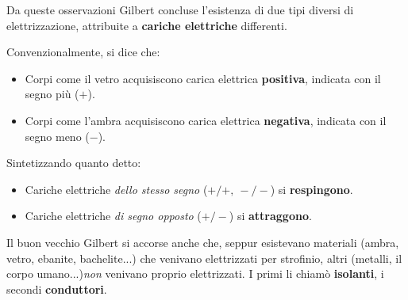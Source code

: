 Da queste osservazioni Gilbert concluse l'esistenza di due tipi diversi di elettrizzazione, attribuite a \textbf{cariche elettriche} differenti.
\begin{define}
	Convenzionalmente, si dice che:
	\begin{itemize}
		\item Corpi come il vetro acquisiscono carica elettrica \textbf{positiva}, indicata con il segno più ($+$).
		\item Corpi come l'ambra acquisiscono carica elettrica \textbf{negativa}, indicata con il segno meno ($-$).
	\end{itemize}
Sintetizzando quanto detto:
\begin{itemize}
	\item Cariche elettriche \textit{dello stesso segno} ($+/+,\ -/-$) si \textbf{respingono}.
	\item Cariche elettriche \textit{di segno opposto} ($+/-$) si \textbf{attraggono}.
\end{itemize}
\end{define}
Il buon vecchio Gilbert si accorse anche che, seppur esistevano materiali (ambra, vetro, ebanite, bachelite...) che venivano elettrizzati per strofinio, altri (metalli, il corpo umano...)\textit{non} venivano proprio elettrizzati. I primi li chiamò \textbf{isolanti}, i secondi \textbf{conduttori}.
